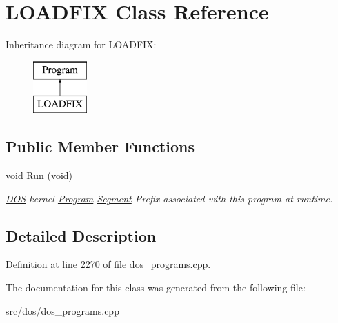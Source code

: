 \hypertarget{classLOADFIX}{\section{L\-O\-A\-D\-F\-I\-X Class Reference}
\label{classLOADFIX}
}
Inheritance diagram for L\-O\-A\-D\-F\-I\-X\-:\begin{figure}[H]
\begin{center}
\leavevmode
\includegraphics[height=2.000000cm]{classLOADFIX}
\end{center}
\end{figure}
\subsection*{Public Member Functions}
\begin{DoxyCompactItemize}
\item 
\hypertarget{classLOADFIX_a2edbc9814c14ed39a0410473df0bcc36}{void \hyperlink{classLOADFIX_a2edbc9814c14ed39a0410473df0bcc36}{Run} (void)}\label{classLOADFIX_a2edbc9814c14ed39a0410473df0bcc36}

\begin{DoxyCompactList}\small\item\em \hyperlink{classDOS}{D\-O\-S} kernel \hyperlink{classProgram}{Program} \hyperlink{structSegment}{Segment} Prefix associated with this program at runtime. \end{DoxyCompactList}\end{DoxyCompactItemize}


\subsection{Detailed Description}


Definition at line 2270 of file dos\-\_\-programs.\-cpp.



The documentation for this class was generated from the following file\-:\begin{DoxyCompactItemize}
\item 
src/dos/dos\-\_\-programs.\-cpp\end{DoxyCompactItemize}
